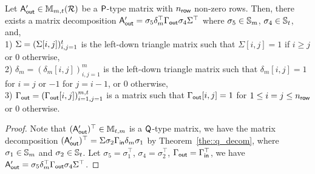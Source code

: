 \label{sec::proof_p}
\begin{theorem} 
\label{the::p_decom}
Let $\mathsf{A}_{\mathsf{out}}' \in \mathbb{M}_{m,t}(\mathcal{R})$ be a $\mathsf{P}$-type matrix with $n_{\mathsf{row}}$ non-zero rows.
Then, there exists a matrix decomposition $\mathsf{A}_{\mathsf{out}}'=\sigma_5 \delta_m ^\top \Gamma_{\mathsf{out}} \sigma_4 \Sigma ^\top$ where $\sigma _5 \in \mathbb{S}_m$, $\sigma_4 \in \mathbb{S}_t$, and, \\
1) $\Sigma=(\Sigma[i, j])_{i,j=1}^{t}$ is the left-down triangle matrix such that $\Sigma[i, j]=1$ if $i \geq j$ or $0$ otherwise,\\
2) $\delta_m=(\delta_m[i,j])_{i,j=1}^{m}$ is the left-down triangle matrix such that $\delta_m[i,j]=1$ for $i=j$ or $-1$ for $j=i-1$, or $0$ otherwise,\\
3) $\Gamma_{\mathsf{out}} =(\Gamma_{\mathsf{out}}[i,j])_{i=1,j=1}^{m,t}$ is a matrix such that $\Gamma_{\mathsf{out}}[i,j]=1$ for $1\leq i=j\leq {\nrow}$ or $0$ otherwise.
\iffalse
1) $\Sigma=(a_{ij})_{i,j=1}^t$ is the left-down triangle matrix such that $a_{ij}=1$ if $i \geq j$ or $0$ otherwise;
2) $\delta_m=(a_{ij})_{i,j=1}^m$ is the left-down triangle matrix such that $b_{ij}=1$ for $i=j$ or $-1$ for $j=i-1$ or $0$ otherwise;
3) $\Gamma_{\nrow}=
\begin{psmallmatrix}
I_{\nrow} & O_{{\nrow},t-{\nrow}} \\
O_{m-{\nrow},{\nrow}} & O_{m-{\nrow},t-{\nrow}}
\end{psmallmatrix} 
=(a_{ij})_{i=1,j=1}^{m,t}$ is the matrix such that $a_{ij}=1$ for $1\leq i=j\leq {\nrow}$ or $0$ otherwise.
\fi
\end{theorem}

\begin{proof}
Note that $(\mathsf{A}_{\mathsf{out}}')^\top \in \mathbb{M}_{t,m}$ is a $\mathsf{Q}$-type matrix, we have the matrix decomposition $(\mathsf{A}_{\mathsf{out}}')^\top=\Sigma \sigma_2 \Gamma_{\mathsf{in}} \delta_m \sigma _1$ by Theorem~\ref{the::q_decom}, where $\sigma_1 \in \mathbb{S}_m$ and $\sigma_2\in \mathbb{S}_t$.
Let $\sigma_5=\sigma_1^\top$, $\sigma_4=\sigma_2^\top$, $\Gamma_{\mathsf{out}}=\Gamma_{\mathsf{in}}^\top$, we have $\mathsf{A}_{\mathsf{out}}'=\sigma_5 \delta_m ^\top \Gamma_{\mathsf{out}} \sigma_4 \Sigma ^\top$.
\end{proof}
 

